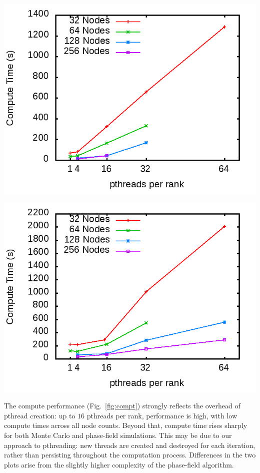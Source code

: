 \documentclass[11pt]{article}
\begin{document}
\begin{multicols*}{2}
\begin{center}
\begin{minipage}{0.4\textwidth}\centering
  \includegraphics[width=\textwidth]{img/prMC-comp}

  \includegraphics[width=\textwidth]{img/pr-comp}
\end{minipage}
\end{center}


The compute performance (Fig.~\ref{fig:compt}) strongly reflects the overhead of pthread creation:
up to $16$ pthreads per rank, performance is high, with low compute times across all node counts.
Beyond that, compute time rises sharply for both Monte Carlo and phase-field simulations.
This may be due to our approach to pthreading:
new threads are created and destroyed for each iteration, rather than persisting throughout the computation process.
Differences in the two plots arise from the slightly higher complexity of the phase-field algorithm.


\end{multicols*}
\end{document}
